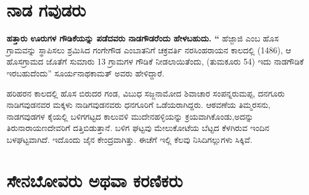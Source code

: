 \section*{ನಾಡ ಗವುಡರು}

\textbf{ಹತ್ತಾರು ಊರುಗಳ ಗೌಡಿಕೆಯನ್ನು ಪಡೆದವರು ನಾಡಗೌಡರೆಂದು ಹೇಳಬಹುದು. “} ಹೆಜ್ಜಾಜಿ ಎಂಬ ಹೊಸ ಗ್ರಾಮವನ್ನು ಸ್ಥಾಪಿಸಲು ಶ್ರಮಿಸಿದ ಗಂಗೇಗೌಡ ಎಂಬಾತನಿಗೆ ಚಕ್ರವರ್ತಿ ನರಸಿಂಹರಾಯನ ಕಾಲದಲ್ಲಿ (1486), ಆ ಹೊಸಗ್ರಾಮದ ಜೊತೆಗೆ ಸುಮಾರು 13 ಗ್ರಾಮಗಳ ಗೌಡಿಕೆ ನೀಡಲಾಯಿತೆಂದು, (ತುಮಕೂರು 54) ಇದು ನಾಡಗೌಡಿಕೆ ಇರಬಹುದೆಂದು” ಸೂರ್ಯನಾಥಕಾಮತ್​ ಅವರು ಹೇಳಿದ್ದಾರೆ.

ಹರಿಹರನ ಕಾಲದಲ್ಲಿ ಹೊಸ ಬಿರುದರ ಗಂಡ, ವಿಬುಧ ಸಜ್ಜನಾಮೋದ ಶಿವಾಚಾರ ಸಂಪನ್ನರುಮಪ್ಪ, ದನಗೂರು ನಾಡಿಗವುಡ\-ನವರ ಮಕ್ಕಳು ನಾಡಿಗವುಡನವರು ಧನಗೂರಿಗೆ ಒಡೆಯರಾಗಿದ್ದರು. ಆಠವಣೆಯ ತಿಮ್ಮರಸನು, ನಾಡಗವುಡಗಳ ಕೈಯಲ್ಲಿ ಬಳಿಗಗಟ್ಟದ ಕಾಲುವಳಿ ಮುದೇನಹಳ್ಳಿಯನ್ನು ಕ್ರಯವಾಗಿಕೊಂಡು,ಅದನ್ನು ತಿರುನಾರಾಯಣದೇವರಿಗೆ ದತ್ತಿ\break ಬಿಡುತ್ತಾನೆ. ಬಳಿಗ ಘಟ್ಟವು ಮೇಲುಕೋಟೆಯ ಬೆಟ್ಟದ ಕೆಳಗಿರುವ ಇಂದಿನ ಬಳಘಟ್ಟವಾಗಿದೆ. ಇದೊಂದು ಜೈನ ಕೇಂದ್ರವಾಗಿತ್ತು. ಈಚೆಗೆ ಇಲ್ಲಿ ಕೆಲವು ನಿಸಿದಿಗಲ್ಲುಗಳು ಸಿಕ್ಕಿವೆ.


\section*{ಸೇನಬೋವರು ಅಥವಾ ಕರಣಿಕರು}

